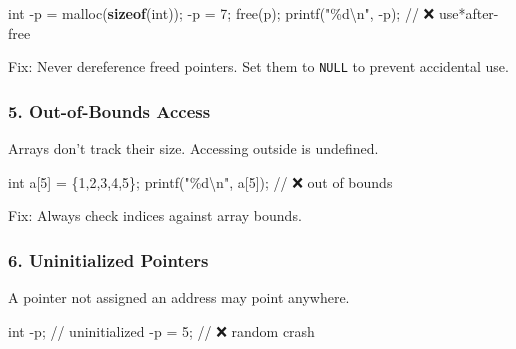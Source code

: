 \documentclass[
  letterpaper,
  DIV=11,
  numbers=noendperiod]{scrreprt}
\newenvironment{Shaded}{\begin{snugshade}}{\end{snugshade}}
\newcommand{\CommentTok}[1]{\textcolor[rgb]{0.37,0.37,0.37}{#1}}
\newcommand{\DataTypeTok}[1]{\textcolor[rgb]{0.68,0.00,0.00}{#1}}
\newcommand{\DecValTok}[1]{\textcolor[rgb]{0.68,0.00,0.00}{#1}}
\newcommand{\KeywordTok}[1]{\textcolor[rgb]{0.00,0.23,0.31}{\textbf{#1}}}
\newcommand{\NormalTok}[1]{\textcolor[rgb]{0.00,0.23,0.31}{#1}}
\newcommand{\OperatorTok}[1]{\textcolor[rgb]{0.37,0.37,0.37}{#1}}
\newcommand{\SpecialCharTok}[1]{\textcolor[rgb]{0.37,0.37,0.37}{#1}}
\newcommand{\StringTok}[1]{\textcolor[rgb]{0.13,0.47,0.30}{#1}}
\begin{document}
\begin{Shaded}
\begin{Highlighting}[]
\DataTypeTok{int} \OperatorTok{{-}}\NormalTok{p }\OperatorTok{=}\NormalTok{ malloc}\OperatorTok{(}\KeywordTok{sizeof}\OperatorTok{(}\DataTypeTok{int}\OperatorTok{));}
\OperatorTok{{-}}\NormalTok{p }\OperatorTok{=} \DecValTok{7}\OperatorTok{;}
\NormalTok{free}\OperatorTok{(}\NormalTok{p}\OperatorTok{);}
\NormalTok{printf}\OperatorTok{(}\StringTok{"}\SpecialCharTok{\%d\textbackslash{}n}\StringTok{"}\OperatorTok{,} \OperatorTok{{-}}\NormalTok{p}\OperatorTok{);} \CommentTok{// ❌ use*after{-}free}
\end{Highlighting}
\end{Shaded}

Fix: Never dereference freed pointers. Set them to \texttt{NULL} to
prevent accidental use.

\subsubsection{5. Out-of-Bounds Access}\label{out-of-bounds-access}

Arrays don't track their size. Accessing outside is undefined.

\begin{Shaded}
\begin{Highlighting}[]
\DataTypeTok{int}\NormalTok{ a}\OperatorTok{[}\DecValTok{5}\OperatorTok{]} \OperatorTok{=} \OperatorTok{\{}\DecValTok{1}\OperatorTok{,}\DecValTok{2}\OperatorTok{,}\DecValTok{3}\OperatorTok{,}\DecValTok{4}\OperatorTok{,}\DecValTok{5}\OperatorTok{\};}
\NormalTok{printf}\OperatorTok{(}\StringTok{"}\SpecialCharTok{\%d\textbackslash{}n}\StringTok{"}\OperatorTok{,}\NormalTok{ a}\OperatorTok{[}\DecValTok{5}\OperatorTok{]);}  \CommentTok{// ❌ out of bounds}
\end{Highlighting}
\end{Shaded}

Fix: Always check indices against array bounds.

\subsubsection{6. Uninitialized Pointers}\label{uninitialized-pointers}

A pointer not assigned an address may point anywhere.

\begin{Shaded}
\begin{Highlighting}[]
\DataTypeTok{int} \OperatorTok{{-}}\NormalTok{p}\OperatorTok{;}   \CommentTok{// uninitialized}
\OperatorTok{{-}}\NormalTok{p }\OperatorTok{=} \DecValTok{5}\OperatorTok{;}   \CommentTok{// ❌ random crash}
\end{Highlighting}
\end{Shaded}
\end{document}
